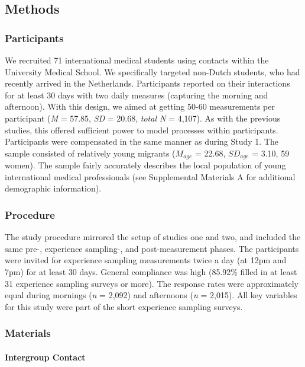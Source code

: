 \subsection{Methods}

\subsubsection{Participants}

We recruited 71 international medical students using contacts within the
University Medical School. We specifically targeted non-Dutch students,
who had recently arrived in the Netherlands. Participants reported on
their interactions for at least 30 days with two daily measures
(capturing the morning and afternoon). With this design, we aimed at
getting 50-60 measurements per participant (\textit{M} = 57.85,
\textit{SD} = 20.68, \textit{total N} = 4,107). As with the previous
studies, this offered sufficient power to model processes within
participants. Participants were compensated in the same manner as during
Study 1. The sample consisted of relatively young migrants (\(M_{age}\)
= 22.68, \(SD_{age}\) = 3.10, 59 women). The sample fairly accurately
describes the local population of young international medical
professionals (see Supplemental Materials A for additional demographic information).

\subsubsection{Procedure}

The study procedure mirrored the setup of studies one and two, and
included the same pre-, experience sampling-, and post-measurement
phases. The participants were invited for experience sampling
measurements twice a day (at 12pm and 7pm) for at least 30 days. General
compliance was high (85.92\% filled in at least 31 experience sampling
surveys or more). The response rates were approximately equal during
mornings (\textit{n} = 2,092) and afternoons (\textit{n} = 2,015). All
key variables for this study were part of the short experience sampling
surveys.

\subsubsection{Materials}

\paragraph{Intergroup Contact}

